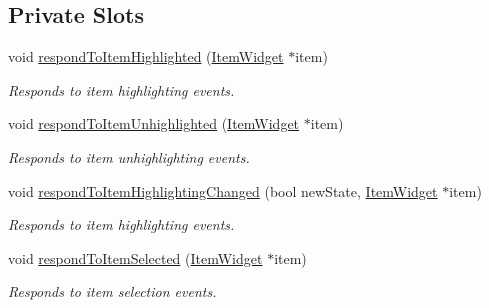 \subsection*{Private Slots}
\begin{DoxyCompactItemize}
\item 
void \hyperlink{class_u_i_1_1_item_collection_widget_ab8f99df3fa03a890cf6ea1b2a187bd89}{respond\-To\-Item\-Highlighted} (\hyperlink{class_u_i_1_1_item_widget}{Item\-Widget} $\ast$item)
\begin{DoxyCompactList}\small\item\em Responds to item highlighting events. \end{DoxyCompactList}\item 
void \hyperlink{class_u_i_1_1_item_collection_widget_a6493e011d663fbc043e93896c3778eb5}{respond\-To\-Item\-Unhighlighted} (\hyperlink{class_u_i_1_1_item_widget}{Item\-Widget} $\ast$item)
\begin{DoxyCompactList}\small\item\em Responds to item unhighlighting events. \end{DoxyCompactList}\item 
void \hyperlink{class_u_i_1_1_item_collection_widget_ae4f965eabc320ccfa1e98be54a0ee72c}{respond\-To\-Item\-Highlighting\-Changed} (bool new\-State, \hyperlink{class_u_i_1_1_item_widget}{Item\-Widget} $\ast$item)
\begin{DoxyCompactList}\small\item\em Responds to item highlighting events. \end{DoxyCompactList}\item 
void \hyperlink{class_u_i_1_1_item_collection_widget_a397e81303b7f0b47b008861314420eda}{respond\-To\-Item\-Selected} (\hyperlink{class_u_i_1_1_item_widget}{Item\-Widget} $\ast$item)
\begin{DoxyCompactList}\small\item\em Responds to item selection events. \end{DoxyCompactList}\end{DoxyCompactItemize}
